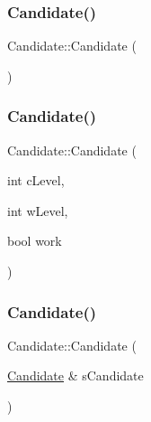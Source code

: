 \subsubsection{\texorpdfstring{Candidate()}{Candidate()}\hspace{0.1cm}{\footnotesize\ttfamily [1/3]}}
{\footnotesize\ttfamily Candidate\+::\+Candidate (\begin{DoxyParamCaption}{ }\end{DoxyParamCaption})\hspace{0.3cm}{\ttfamily [inline]}}

\hypertarget{class_candidate_a627ea8e00c8e5a4a6d4427a2ac41d41a}{}\label{class_candidate_a627ea8e00c8e5a4a6d4427a2ac41d41a} 
\subsubsection{\texorpdfstring{Candidate()}{Candidate()}\hspace{0.1cm}{\footnotesize\ttfamily [2/3]}}
{\footnotesize\ttfamily Candidate\+::\+Candidate (\begin{DoxyParamCaption}\item[{int}]{c\+Level,  }\item[{int}]{w\+Level,  }\item[{bool}]{work }\end{DoxyParamCaption})\hspace{0.3cm}{\ttfamily [inline]}}

\hypertarget{class_candidate_a318c0f73f0e3091883c66ef970b3794e}{}\label{class_candidate_a318c0f73f0e3091883c66ef970b3794e} 
\subsubsection{\texorpdfstring{Candidate()}{Candidate()}\hspace{0.1cm}{\footnotesize\ttfamily [3/3]}}
{\footnotesize\ttfamily Candidate\+::\+Candidate (\begin{DoxyParamCaption}\item[{\hyperlink{class_candidate}{Candidate} \&}]{s\+Candidate }\end{DoxyParamCaption})\hspace{0.3cm}{\ttfamily [inline]}}

\hypertarget{class_candidate_a61ad4ae35e7a3ce5e5b91204b55c0b55}{}\label{class_candidate_a61ad4ae35e7a3ce5e5b91204b55c0b55} 
